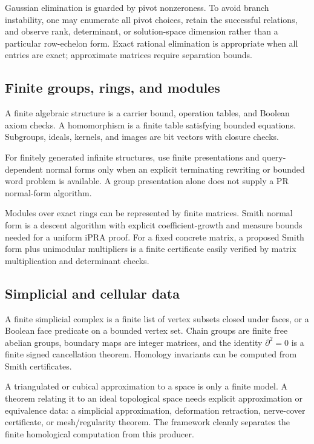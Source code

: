 Gaussian elimination is guarded by pivot nonzeroness.  To avoid branch
instability, one may enumerate all pivot choices, retain the successful
relations, and observe rank, determinant, or solution-space dimension rather
than a particular row-echelon form.  Exact rational elimination is appropriate
when all entries are exact; approximate matrices require separation bounds.

\subsection{Finite groups, rings, and modules}

A finite algebraic structure is a carrier bound, operation tables, and Boolean
axiom checks.  A homomorphism is a finite table satisfying bounded equations.
Subgroups, ideals, kernels, and images are bit vectors with closure checks.

For finitely generated infinite structures, use finite presentations and query-
dependent normal forms only when an explicit terminating rewriting or bounded
word problem is available.  A group presentation alone does not supply a PR
normal-form algorithm.

Modules over exact rings can be represented by finite matrices.  Smith normal
form is a descent algorithm with explicit coefficient-growth and measure bounds
needed for a uniform iPRA proof.  For a fixed concrete matrix, a proposed Smith
form plus unimodular multipliers is a finite certificate easily verified by
matrix multiplication and determinant checks.

\subsection{Simplicial and cellular data}

A finite simplicial complex is a finite list of vertex subsets closed under
faces, or a Boolean face predicate on a bounded vertex set.  Chain groups are
finite free abelian groups, boundary maps are integer matrices, and the
identity \(\partial^2=0\) is a finite signed cancellation theorem.  Homology
invariants can be computed from Smith certificates.

A triangulated or cubical approximation to a space is only a finite model.  A
theorem relating it to an ideal topological space needs explicit approximation
or equivalence data: a simplicial approximation, deformation retraction,
nerve-cover certificate, or mesh/regularity theorem.  The framework cleanly
separates the finite homological computation from this producer.

